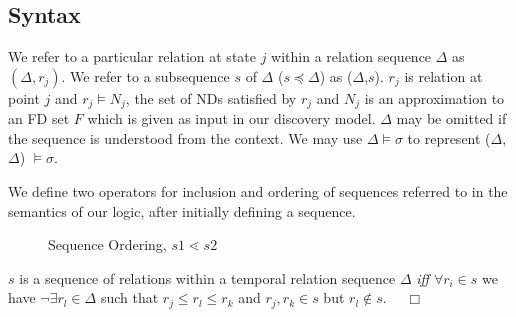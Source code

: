 \subsection{Syntax}


We refer to a particular relation at state $j$ within a relation
sequence $\Delta$ as $(\Delta,r_j)$. We refer to a subsequence $s$ of
$\Delta$ ($s \preceq \Delta$) as ($\Delta$,$s$).
$r_j$ is relation at point $j$ and $r_j \models N_j$, the set of
NDs satisfied by $r_j$ and $N_j$ is an approximation to an FD set $F$
which is given as input in our discovery model.  
$\Delta$ may be omitted if the sequence is understood from the context.
We may use $\Delta \models \sigma$ to represent ($\Delta$,$\Delta$)
$\models \sigma$.

We define two operators for inclusion and ordering of sequences
referred to in the semantics of our logic, after initially defining
a sequence.

\begin{figure}
\begin{minipage}{6cm}
\centerline{}
\caption{\label{fig:inclusion} {Sequence Inclusion, $s \preceq \Delta$}}
\end{minipage}
\hfill
\begin{minipage}{6cm}
\centerline{}
\caption{\label{fig:ordering} {Sequence Ordering, $s1 \lessdot s2$}}
\end{minipage}
\end{figure}

\begin{definition}[Sequence]\label{tl_def:sequence}
\begin{rm}
$s$ is a sequence of relations within a temporal relation sequence
$\Delta$ {\em iff} $\forall r_i \in s$ we have $\neg \exists r_l \in \Delta$ such that $r_j \le r_l \le r_k$ and
$r_j,r_k \in s$ but $r_l \not\in s$. $\quad\Box$
\end{rm}
\end{definition}

